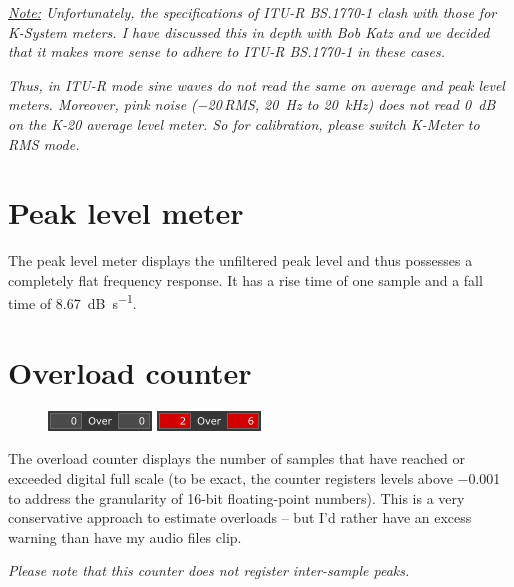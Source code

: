 \emph{\underline{Note:} Unfortunately, the specifications of ITU-R
  BS.1770-1 clash with those for K-System meters.  I have discussed
  this in depth with Bob Katz and we decided that it makes more sense
  to adhere to ITU-R BS.1770-1 in these cases.}

\emph{Thus, in ITU-R mode sine waves do \emph{not} read the same on
  average and peak level meters.  Moreover, pink noise
  (\SI{-20}{\dBFS}\,RMS, \SI{20}{\hertz} to \SI{20}{\kilo\hertz}) does
  \emph{not} read \SI{0}{\dB} on the K-20 average level meter.  So for
  calibration, please switch K-Meter to RMS mode.}

\section{Peak level meter}

The peak level meter displays the unfiltered peak level and thus
possesses a completely flat frequency response.  It has a rise time of
one sample and a fall time of \SI{8.67}{\dB\per\second}.

\section{Overload counter}

\begin{figure}
  \includegraphics[scale=\screenshotscale,clip]{include/images/overload_counter_normal.png}
  \newline \vspace{-0.9\baselineskip}
  \includegraphics[scale=\screenshotscale,clip]{include/images/overload_counter_clipped.png}
\end{figure}

The overload counter displays the number of samples that have reached
or exceeded digital full scale (to be exact, the counter registers
levels above \SI{-0.001}{\dBFS} to address the granularity of
\num{16}-bit floating-point numbers).  This is a very conservative
approach to estimate overloads -- but I'd rather have an excess
warning than have my audio files clip.

\emph{Please note that this counter does not register inter-sample
  peaks.}

